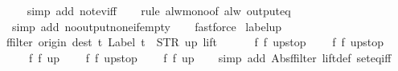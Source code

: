 \begin{isabellebody}
%
\isadelimproof
\ \ %
\endisadelimproof
%
\isatagproof
{}\isamarkupfalse%
\ {\isacharparenleft}simp\ add{\isacharcolon}\ not{\isacharunderscore}ev{\isacharunderscore}iff{\isacharparenright}\isanewline
\ \ \isamarkupfalse%
\ {\isacharparenleft}rule\ alw{\isacharunderscore}mono{\isacharbrackleft}of\ {\isachardoublequoteopen}alw\ {\isacharparenleft}output{\isacharunderscore}eq\ {\isacharbrackleft}{\isacharbrackright}{\isacharparenright}{\isachardoublequoteclose}{\isacharbrackright}{\isacharparenright}\isanewline
\ \ \ \isamarkupfalse%
\ {\isacharparenleft}simp\ add{\isacharcolon}\ no{\isacharunderscore}output{\isacharunderscore}none{\isacharunderscore}if{\isacharunderscore}empty{\isacharparenright}\isanewline
\ \ \isamarkupfalse%
\ fastforce%
\endisatagproof
{\isafoldproof}%
%
\isadelimproof
\isanewline
%
\endisadelimproof
\isanewline
{}\isamarkupfalse%
\ label{\isacharunderscore}up{\isacharcolon}\isanewline
{\isachardoublequoteopen}ffilter\ {\isacharparenleft}{\isasymlambda}{\isacharparenleft}{\isacharparenleft}origin{\isacharcomma}\ dest{\isacharparenright}{\isacharcomma}\ t{\isacharparenright}{\isachardot}\ Label\ t\ {\isacharequal}\ STR\ {\isacharprime}{\isacharprime}up{\isacharprime}{\isacharprime}{\isacharparenright}\ lift\ {\isacharequal}\ {\isacharbraceleft}{\isacharbar}\isanewline
\ \ \ \ {\isacharparenleft}{\isacharparenleft}f{}{\isacharcomma}\ f{}{\isacharparenright}{\isacharcomma}\ up{}{}stop{\isacharparenright}{\isacharcomma}\isanewline
\ \ \ \ {\isacharparenleft}{\isacharparenleft}f{}{\isacharcomma}\ f{}{\isacharparenright}{\isacharcomma}\ up{}{}stop{\isacharparenright}{\isacharcomma}\isanewline
\ \ \ \ {\isacharparenleft}{\isacharparenleft}f{}{\isacharcomma}\ f{}{\isacharparenright}{\isacharcomma}\ up{}{}{\isacharparenright}{\isacharcomma}\isanewline
\ \ \ \ {\isacharparenleft}{\isacharparenleft}f{}{\isacharcomma}\ f{}{\isacharparenright}{\isacharcomma}\ up{}{}stop{\isacharparenright}{\isacharcomma}\isanewline
\ \ \ \ {\isacharparenleft}{\isacharparenleft}f{}{\isacharcomma}\ f{}{\isacharparenright}{\isacharcomma}\ up{}{}{\isacharparenright}\isanewline
{\isacharbar}{\isacharbraceright}{\isachardoublequoteclose}\isanewline
%
\isadelimproof
\ \ %
\endisadelimproof
%
\isatagproof
{}\isamarkupfalse%
\ {\isacharparenleft}simp\ add{\isacharcolon}\ Abs{\isacharunderscore}ffilter\ lift{\isacharunderscore}def\ set{\isacharunderscore}eq{\isacharunderscore}iff{\isacharparenright}\isanewline

\end{isabellebody}
